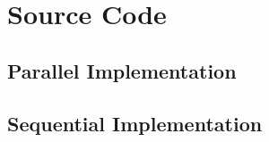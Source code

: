 \documentclass[11pt]{article}
\begin{document}
\section{Source Code}
\lstset{numbers=left, language=C}
\subsection{Parallel Implementation}

\pagebreak
\subsection{Sequential Implementation}

\end{document}
